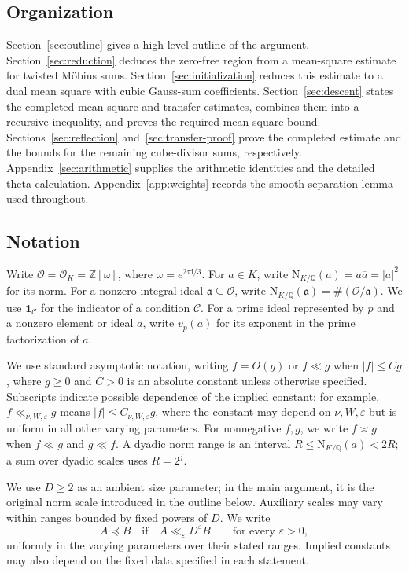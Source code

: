 \documentclass[11pt,a4paper]{article}
\numberwithin{equation}{section}
\numberwithin{figure}{section}
\theoremstyle{definition}
\theoremstyle{remark}
\newcommand{\Q}{\mathbb Q}
\newcommand{\NK}{\mathrm N_{K/\Q}}
\newcommand{\OO}{\mathcal O}
\newcommand{\ind}{\mathbf1}
\newcommand{\precbd}{\preccurlyeq}
\begin{document}
\subsection{Organization}

Section~\ref{sec:outline} gives a high-level outline of the argument.
Section~\ref{sec:reduction} deduces the zero-free region from a
mean-square estimate for twisted M\"obius sums.
Section~\ref{sec:initialization} reduces this estimate to a dual mean
square with cubic Gauss-sum coefficients.
Section~\ref{sec:descent} states the completed mean-square and transfer
estimates, combines them into a recursive inequality, and proves the
required mean-square bound.
Sections~\ref{sec:reflection} and~\ref{sec:transfer-proof} prove the
completed estimate and the bounds for the remaining cube-divisor sums, respectively.
Appendix~\ref{sec:arithmetic} supplies the arithmetic identities and
the detailed theta calculation. Appendix~\ref{app:weights} records the smooth
separation lemma used throughout.

\subsection{Notation}

Write $\OO=\OO_K=\mathbb Z[\omega]$, where $\omega=e^{2\pi\mathrm i/3}$.
For $a\in K$, write $\NK(a)=a\overline a=|a|^2$ for its norm.
For a nonzero integral ideal $\mathfrak a\subseteq\OO$, write
$\NK(\mathfrak a)=\#(\OO/\mathfrak a)$.
We use $\ind_{\mathcal C}$ for the indicator of a condition $\mathcal C$.
For a prime ideal represented by $p$ and a nonzero element or ideal $a$,
write $v_p(a)$ for its exponent in the prime factorization of $a$.


We use standard asymptotic notation, writing $f=O(g)$ or $f\ll g$ when $|f|\le Cg$, where $g\ge0$ and $C>0$ is an absolute constant unless otherwise specified. Subscripts indicate possible dependence of the implied constant: for example, $f\ll_{\nu,W,\varepsilon}g$ means $|f|\le C_{\nu,W,\varepsilon}g$, where the constant may depend on $\nu,W,\varepsilon$ but is uniform in all other varying parameters. For nonnegative $f,g$, we write $f\asymp g$ when $f\ll g$ and $g\ll f$.
 A dyadic norm range is an interval $R\le\NK(a)<2R$; a sum over dyadic scales uses $R=2^j$.

We use $D\ge2$ as an ambient size parameter; in the main argument, it is the original norm scale introduced 
in the outline below. Auxiliary scales may vary within ranges bounded by fixed powers of $D$. We write
\[
A\precbd B \quad\text{if}\quad A\ll_\varepsilon D^\varepsilon B
\qquad\text{for every }\varepsilon>0,
\]
uniformly in the varying parameters over their stated ranges. Implied constants may also depend on the fixed data specified in each statement.
\end{document}
